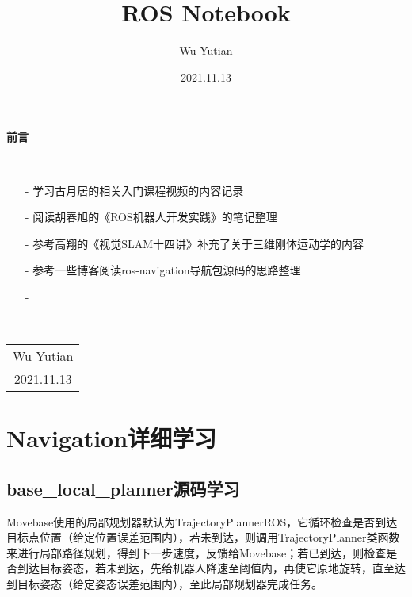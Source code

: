 \documentclass[9pt, oneside]{book}
\title{\Huge{\textbf{ROS Notebook}}}
\author{Wu Yutian}
\date{2021.11.13}
\begin{document}
\maketitle

\setcounter{page}{1}

\begin{center}
    \Huge\textbf{前言}
\end{center}~\

\normalsize
\begin{itemize}
    \item [-] 学习古月居的相关入门课程视频的内容记录
    \item [-] 阅读胡春旭的《ROS机器人开发实践》的笔记整理
    \item [-] 参考高翔的《视觉SLAM十四讲》补充了关于三维刚体运动学的内容
    \item [-] 参考一些博客阅读ros-navigation导航包源码的思路整理
    \item [-]
\end{itemize}

~\\
\begin{flushright}     
    \begin{tabular}{c}
        Wu Yutian\\
        2021.11.13
    \end{tabular}
\end{flushright}

\newpage
{}
\setcounter{page}{1}
\tableofcontents
\newpage
\setcounter{page}{1}



\chapter{Navigation详细学习}

\section{base\_local\_planner源码学习}

Movebase使用的局部规划器默认为TrajectoryPlannerROS，它循环检查是否到达目标点位置（给定位置误差范围内），若未到达，则调用TrajectoryPlanner类函数来进行局部路径规划，得到下一步速度，反馈给Movebase；若已到达，则检查是否到达目标姿态，若未到达，先给机器人降速至阈值内，再使它原地旋转，直至达到目标姿态（给定姿态误差范围内），至此局部规划器完成任务。
\end{document}
